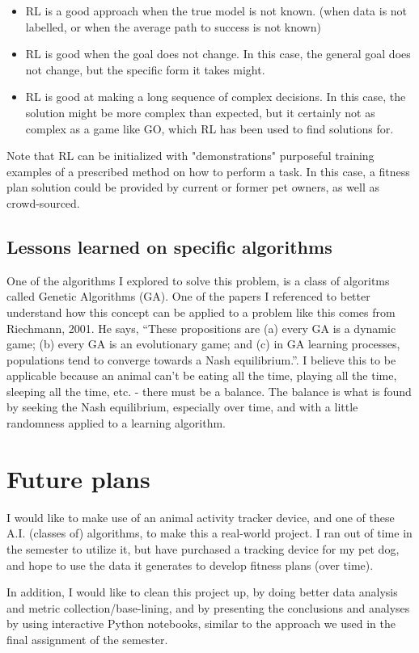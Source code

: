 \documentclass{article}
\begin{document}
\begin{itemize}
  \item RL is a good approach when the true model is not known. (when data is not labelled, or when the average path to success is not known)
  \item RL is good when the goal does not change. In this case, the general goal does not change, but the specific form it takes might.
  \item RL is good at making a long sequence of complex decisions. In this case, the solution might be more complex than expected, but it certainly not as complex as a game like GO, which RL has been used to find solutions for.
\end{itemize}

Note that RL can be initialized with "demonstrations" purposeful training examples of a prescribed method on how to perform a task. In this case, a fitness plan solution could be provided by current or former pet owners, as well as crowd-sourced.

\subsection{Lessons learned on specific algorithms}

One of the algorithms I explored to solve this problem, is a class of algoritms called Genetic Algorithms (GA). One of the papers I referenced to better understand how this concept can be applied to a problem like this comes from Riechmann, 2001. \cite{RIECHMANN20011019} He says, ``These propositions are (a) every GA is a dynamic game; (b) every GA is an evolutionary game; and (c) in GA learning processes, populations tend to converge towards a Nash equilibrium.''. I believe this to be applicable because an animal can't be eating all the time, playing all the time, sleeping all the time, etc. - there must be a balance. The balance is what is found by seeking the Nash equilibrium, especially over time, and with a little randomness applied to a learning algorithm.
  
\section{Future plans}

I would like to make use of an animal activity tracker device, and one of these A.I. (classes of) algorithms, to make this a real-world project. I ran out of time in the semester to utilize it, but have purchased a tracking device for my pet dog, and hope to use the data it generates to develop fitness plans (over time).

In addition, I would like to clean this project up, by doing better data analysis and metric collection/base-lining, and by presenting the conclusions and analyses by using interactive Python notebooks, similar to the approach we used in the final assignment of the semester.

\newpage

\raggedright

\end{document}
